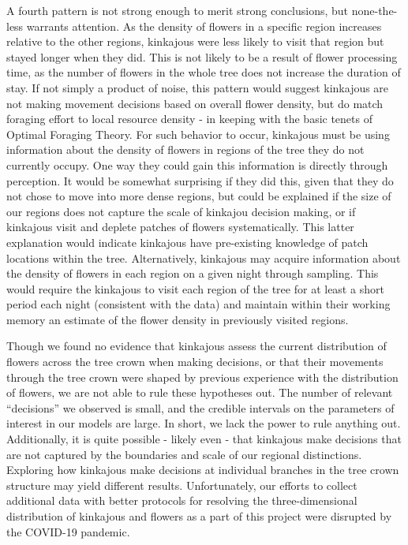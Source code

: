 \documentclass[twoside,12pt,final]{ucthesis-CA2012}
\begin{document}
\begin{ucmainmatter}
A fourth pattern is not strong enough to merit strong conclusions, but none-the-less warrants attention. As the density of flowers in a specific region increases relative to the other regions, kinkajous were less likely to visit that region but stayed longer when they did. This is not likely to be a result of flower processing time, as the number of flowers in the whole tree does not increase the duration of stay. If not simply a product of noise, this pattern would suggest kinkajous are not making movement decisions based on overall flower density, but do match foraging effort to local resource density - in keeping with the basic tenets of Optimal Foraging Theory. For such behavior to occur, kinkajous must be using information about the density of flowers in regions of the tree they do not currently occupy. One way they could gain this information is directly through perception. It would be somewhat surprising if they did this, given that they do not chose to move into more dense regions, but could be explained if the size of our regions does not capture the scale of kinkajou decision making, or if kinkajous visit and deplete patches of flowers systematically. This latter explanation would indicate kinkajous have pre-existing knowledge of patch locations within the tree. Alternatively, kinkajous may acquire information about the density of flowers in each region on a given night through sampling. This would require the kinkajous to visit each region of the tree for at least a short period each night (consistent with the data) and maintain within their working memory an estimate of the flower density in previously visited regions.

Though we found no evidence that kinkajous assess the current distribution of flowers across the tree crown when making decisions, or that their movements through the tree crown were shaped by previous experience with the distribution of flowers, we are not able to rule these hypotheses out. The number of relevant ``decisions'' we observed is small, and the credible intervals on the parameters of interest in our models are large. In short, we lack the power to rule anything out. Additionally, it is quite possible - likely even - that kinkajous make decisions that are not captured by the boundaries and scale of our regional distinctions. Exploring how kinkajous make decisions at individual branches in the tree crown structure may yield different results. Unfortunately, our efforts to collect additional data with better protocols for resolving the three-dimensional distribution of kinkajous and flowers as a part of this project were disrupted by the COVID-19 pandemic.


\end{ucmainmatter}
\end{document}
